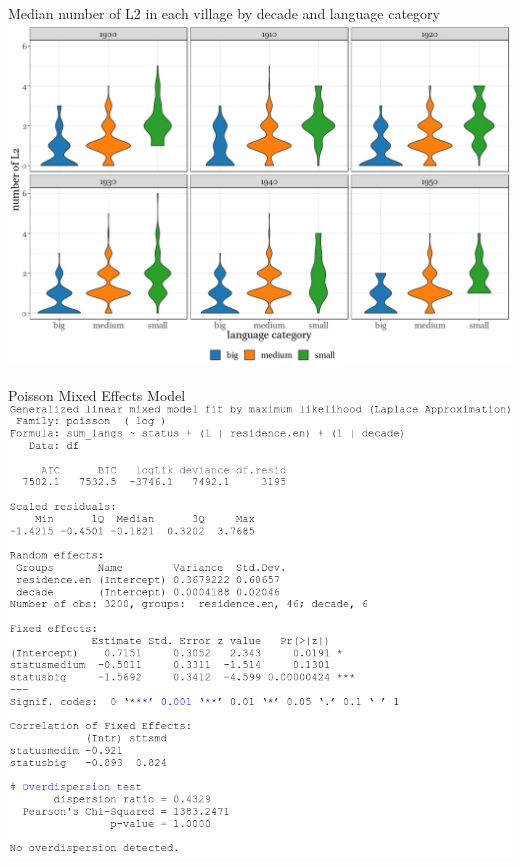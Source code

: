 \documentclass[13pt, t]{beamer}
\begin{document}



\begin{frame}{Median number of L2 in each village by decade and language category}
\hspace{-0.9cm}\includegraphics[width=1.08\linewidth]{images/12_panel_1100_750}
\end{frame}

\begin{frame}{Poisson Mixed Effects Model}
\includegraphics[width=0.87\linewidth]{images/13_poisson}
\end{frame}
\end{document}
